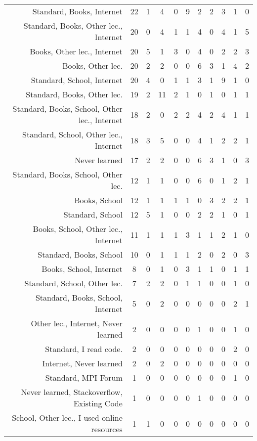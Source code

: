 {\begin{landscape}
\begin{longtable}[htb]{r|c|c|c|c|c|c|c|c|c|c}
{Standard, Books, Internet} & 22 & 1 & 4 & 0 & 9 & 2 & 2 & 3 & 1 & 0 \\%
{Standard, Books, Other lec., Internet} & 20 & 0 & 4 & 1 & 1 & 4 & 0 & 4 & 1 & 5 \\%
{Books, Other lec., Internet} & 20 & 5 & 1 & 3 & 0 & 4 & 0 & 2 & 2 & 3 \\%
{Books, Other lec.} & 20 & 2 & 2 & 0 & 0 & 6 & 3 & 1 & 4 & 2 \\%
{Standard, School, Internet} & 20 & 4 & 0 & 1 & 1 & 3 & 1 & 9 & 1 & 0 \\%
{Standard, Books, Other lec.} & 19 & 2 & 11 & 2 & 1 & 0 & 1 & 0 & 1 & 1 \\%
{Standard, Books, School, Other lec., Internet} & 18 & 2 & 0 & 2 & 2 & 4 & 2 & 4 & 1 & 1 \\%
{Standard, School, Other lec., Internet} & 18 & 3 & 5 & 0 & 0 & 4 & 1 & 2 & 2 & 1 \\%
{Never learned} & 17 & 2 & 2 & 0 & 0 & 6 & 3 & 1 & 0 & 3 \\%
{Standard, Books, School, Other lec.} & 12 & 1 & 1 & 0 & 0 & 6 & 0 & 1 & 2 & 1 \\%
{Books, School} & 12 & 1 & 1 & 1 & 1 & 0 & 3 & 2 & 2 & 1 \\%
{Standard, School} & 12 & 5 & 1 & 0 & 0 & 2 & 2 & 1 & 0 & 1 \\%
{Books, School, Other lec., Internet} & 11 & 1 & 1 & 1 & 3 & 1 & 1 & 2 & 1 & 0 \\%
{Standard, Books, School} & 10 & 0 & 1 & 1 & 1 & 2 & 0 & 2 & 0 & 3 \\%
{Books, School, Internet} & 8 & 0 & 1 & 0 & 3 & 1 & 1 & 0 & 1 & 1 \\%
{Standard, School, Other lec.} & 7 & 2 & 2 & 0 & 1 & 1 & 0 & 0 & 1 & 0 \\%
{Standard, Books, School, Internet} & 5 & 0 & 2 & 0 & 0 & 0 & 0 & 0 & 2 & 1 \\%
{Other lec., Internet, Never learned} & 2 & 0 & 0 & 0 & 0 & 1 & 0 & 0 & 1 & 0 \\%
{Standard, I read code.} & 2 & 0 & 0 & 0 & 0 & 0 & 0 & 0 & 2 & 0 \\%
{Internet, Never learned} & 2 & 0 & 2 & 0 & 0 & 0 & 0 & 0 & 0 & 0 \\%
{Standard, MPI Forum} & 1 & 0 & 0 & 0 & 0 & 0 & 0 & 0 & 1 & 0 \\%
{Never learned, Stackoverflow, Existing Code} & 1 & 0 & 0 & 0 & 0 & 1 & 0 & 0 & 0 & 0 \\%
{School, Other lec., I used online resources} & 1 & 1 & 0 & 0 & 0 & 0 & 0 & 0 & 0 & 0 \\%

\end{longtable}
\end{landscape}}
